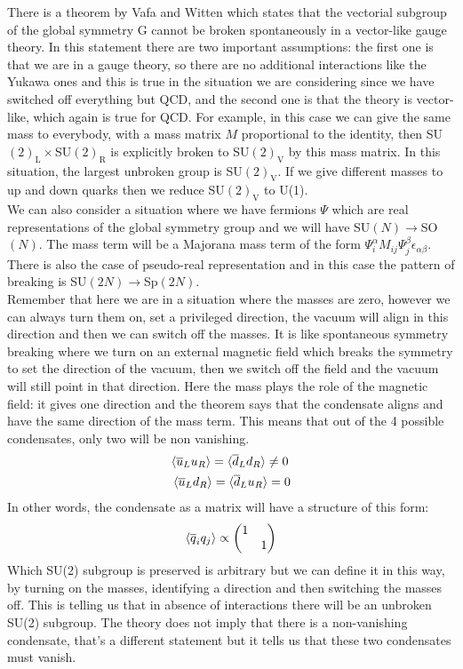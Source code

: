 \documentclass[../main.tex]{subfiles}
\begin{document}
There is a theorem by Vafa and Witten which states that the vectorial subgroup of the global symmetry G cannot be broken spontaneously in a vector-like gauge theory. In this statement there are two important assumptions: the first one is that we are in a gauge theory, so there are no additional interactions like the Yukawa ones and this is true in the situation we are considering since we have switched off everything but QCD, and the second one is that the theory is vector-like, which again is true for QCD. For example, in this case we can give the same mass to everybody, with a mass matrix $M$ proportional to the identity, then SU$(2)_{\text{L}}\times$SU$(2)_{\text{R}}$ is explicitly broken to SU$(2)_{\text{V}}$ by this mass matrix. In this situation, the largest unbroken group is SU$(2)_{\text{V}}$. If we give different masses to up and down quarks then we reduce SU$(2)_{\text{V}}$ to U(1).\\
We can also consider a situation where we have fermions $\Psi$ which are real representations of the global symmetry group and we will have SU$(N)\to$SO$(N)$. The mass term will be a Majorana mass term of the form $\Psi_i^\alpha M_{ij}\Psi_j^\beta\epsilon_{\alpha\beta}$. There is also the case of pseudo-real representation and in this case the pattern of breaking is SU$(2N)\to$Sp$(2N)$.\\
Remember that here we are in a situation where the masses are zero, however we can always turn them on, set a privileged direction, the vacuum will align in this direction and then we can switch off the masses. It is like spontaneous symmetry breaking where we turn on an external magnetic field which breaks the symmetry to set the direction of the vacuum, then we switch off the field and the vacuum will still point in that direction. Here the mass plays the role of the magnetic field: it gives one direction and the theorem says that the condensate aligns and have the same direction of the mass term. This means that out of the 4 possible condensates, only two will be non vanishing.
\[
\begin{aligned}
    &\langle\overline{u}_Lu_R\rangle=\langle\overline{d}_Ld_R\rangle\neq0\\
    &\Braket{\overline{u}_Ld_R}=\langle\overline{d}_Lu_R\rangle=0
\end{aligned}
\]
In other words, the condensate as a matrix will have a structure of this form:
\[
\Braket{\overline{q}_iq_j}\propto\mqty(\dmat{1,1})
\]
Which SU(2) subgroup is preserved is arbitrary but we can define it in this way, by turning on the masses, identifying a direction and then switching the masses off. This is telling us that in absence of interactions there will be an unbroken SU(2) subgroup. The theory does not imply that there is a non-vanishing condensate, that's a different statement but it tells us that these two condensates must vanish.\\
\end{document}
